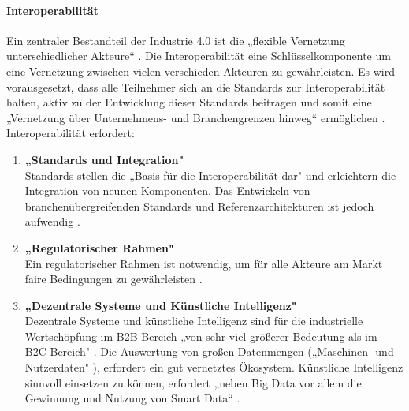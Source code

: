 \paragraph{Interoperabilität}\label{sec:Interoperabilität}
\noindent Ein zentraler Bestandteil der Industrie 4.0 ist die „flexible Vernetzung unterschiedlicher Akteure“ \cite[S.5]{3}. Die Interoperabilität eine Schlüsselkomponente um eine Vernetzung zwischen vielen verschieden Akteuren zu gewährleisten. Es wird vorausgesetzt, dass alle Teilnehmer sich an die Standards zur Interoperabilität halten, aktiv zu der Entwicklung dieser Standards beitragen und somit eine „Vernetzung über Unternehmens- und Branchengrenzen hinweg“ \cite[S.5]{3} ermöglichen \cite[S.5]{3}. Interoperabilität erfordert:
\begin{enumerate}
	\item \textbf{„Standards und Integration"} \cite[S.5]{3} \\
	Standards stellen die „Basis für die Interoperabilität dar" \cite[S.5]{3} und erleichtern die Integration von neunen Komponenten. Das Entwickeln von branchenübergreifenden Standards und
	Referenzarchitekturen ist jedoch aufwendig \cite[S.5]{3}.
	\item \textbf{„Regulatorischer Rahmen"} \cite[S.5]{3} \\
	Ein regulatorischer Rahmen ist notwendig, um für alle Akteure am Markt faire Bedingungen zu gewährleisten \cite[S.5]{3}.
	\item \textbf{„Dezentrale Systeme und Künstliche Intelligenz"} \cite[S.5]{3} \\
	Dezentrale Systeme und künstliche Intelligenz sind für die industrielle Wertschöpfung im 
	B2B-Bereich „von sehr viel größerer Bedeutung als im B2C-Bereich" \cite[S.5]{3}. Die Auswertung von großen Datenmengen („Maschinen- und Nutzerdaten" \cite[S.5]{3}), erfordert ein gut vernetztes Ökosystem. Künstliche Intelligenz sinnvoll einsetzen zu können, erfordert „neben Big Data vor allem die Gewinnung und Nutzung von Smart Data“ \cite[S.5]{3}.
\end{enumerate}

